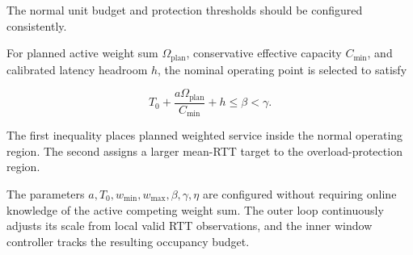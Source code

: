 The normal unit budget and protection thresholds should be configured consistently.

For planned active weight sum \(\Omega_{\mathrm{plan}}\), conservative effective capacity \(C_{\min}\), and calibrated latency headroom \(h\), the nominal operating point is selected to satisfy

\begin{equation}
\label{eq:app-f-44}
\boxed{
T_0+
\frac{a\Omega_{\mathrm{plan}}}{C_{\min}}
+h
\le\beta<\gamma.
}
\end{equation}

The first inequality places planned weighted service inside the normal operating region. The second assigns a larger mean-RTT target to the overload-protection region.

The parameters \(a,T_0,w_{\min},w_{\max},\beta,\gamma,\eta\) are configured without requiring online knowledge of the active competing weight sum. The outer loop continuously adjusts its scale from local valid RTT observations, and the inner window controller tracks the resulting occupancy budget.

